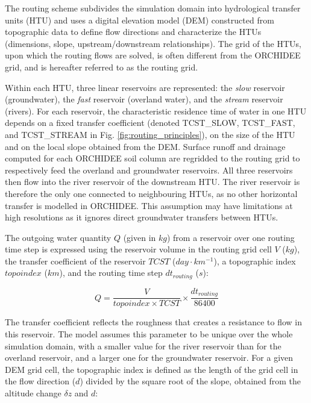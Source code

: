 The routing scheme subdivides the simulation domain into hydrological transfer units (HTU) and uses a digital elevation model (DEM) constructed from topographic data to define flow directions and characterize the HTUs (dimensions, slope, upstream/downstream relationships). The grid of the HTUs, upon which the routing flows are solved, is often different from the ORCHIDEE grid, and is hereafter referred to as the routing grid.

Within each HTU, three linear reservoirs are represented: the \textit{slow} reservoir (groundwater), the \textit{fast} reservoir (overland water), and the \textit{stream} reservoir (rivers). For each reservoir, the characteristic residence time of water in one HTU depends on a fixed transfer coefficient (denoted TCST\_SLOW, TCST\_FAST, and TCST\_STREAM in Fig. \ref{fig:routing_principles}), on the size of the HTU and on the local slope obtained from the DEM.
Surface runoff and drainage computed for each ORCHIDEE soil column are regridded to the routing grid to respectively feed the overland and groundwater reservoirs. All three reservoirs then flow into the river reservoir of the downstream HTU. The river reservoir is therefore the only one connected to neighbouring HTUs, as no other horizontal transfer is modelled in ORCHIDEE. This assumption may have limitations at high resolutions as it ignores direct groundwater transfers between HTUs.

The outgoing water quantity $Q$ (given in $kg$) from a reservoir over one routing time step is expressed using the reservoir volume in the routing grid cell $V$ ($kg$), the transfer coefficient of the reservoir $TCST$ ($day \cdot km^{-1}$), a topographic index $topoindex$ ($km$), and the routing time step $dt_{routing}$ ($s$):

\begin{equation}
    Q = \frac{V}{topoindex \times TCST} \times \frac{dt_{routing}}{86400}
\end{equation}

The transfer coefficient reflects the roughness that creates a resistance to flow in this reservoir. The model assumes this parameter to be unique over the whole simulation domain, with a smaller value for the river reservoir than for the overland reservoir, and a larger one for the groundwater reservoir.
For a given DEM grid cell, the topographic index is defined as the length of the grid cell in the flow direction ($d$) divided by the square root of the slope, obtained from the altitude change $\delta z$ and $d$:

